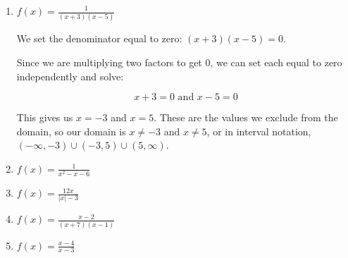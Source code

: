 \documentclass{ximera}
\begin{document}
\begin{enumerate}
	\item $f(x) = \frac{1}{(x + 3)(x - 5)}$
		\begin{expandable}
			We set the denominator equal to zero: $(x + 3)(x - 5) = 0$. 

Since we are multiplying two factors to get 0, we can set each equal to zero independently and solve: 

$$x + 3 = 0 \text{ and } x - 5 = 0$$

This gives us $x = -3$ and $x = 5$. These are the values we exclude from the domain, so our domain is $x \ne -3$ and $x \ne 5$, or in interval notation, $(-\infty, -3) \cup (-3, 5) \cup (5, \infty)$. 
		\end{expandable}
	\item $f(x) = \frac{1}{x^2 - x - 6}$
	\item $f(x) = \frac{12x}{|x| - 3}$
	\item $f(x) = \frac{x - 2}{(x + 7)(x - 1)}$
	\item $f(x) = \frac{x - 4}{x - 3}$
\end{enumerate}
\end{document}
